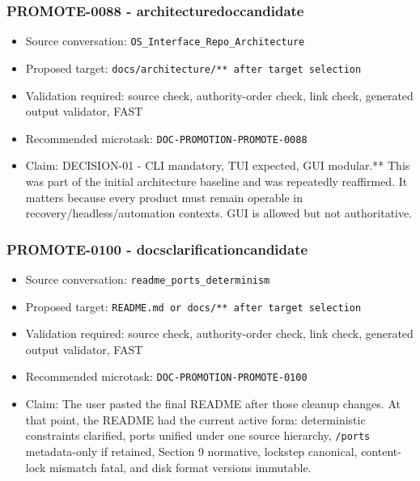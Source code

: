 \documentclass[9pt,a4paper,openany]{book}
\begin{document}
\subsubsection{PROMOTE-0088 - architecturedoccandidate}

\begin{itemize}
\item Source conversation: \texttt{OS\_\allowbreak{}Interface\_\allowbreak{}Repo\_\allowbreak{}Architecture}
\item Proposed target: \texttt{docs/\allowbreak{}architecture/\allowbreak{}** after target selection}
\item Validation required: source check, authority-\allowbreak{}order check, link check, generated output validator, FAST
\item Recommended microtask: \texttt{DOC-\allowbreak{}PROMOTION-\allowbreak{}PROMOTE-\allowbreak{}0088}
\item Claim: DECISION-\allowbreak{}01 -\allowbreak{} CLI mandatory, TUI expected, GUI modular.\allowbreak{}** This was part of the initial architecture baseline and was repeatedly reaffirmed.\allowbreak{} It matters because every product must remain operable in recovery/\allowbreak{}headless/\allowbreak{}automation contexts.\allowbreak{} GUI is allowed but not authoritative.\allowbreak{}
\end{itemize}

\subsubsection{PROMOTE-0100 - docsclarificationcandidate}

\begin{itemize}
\item Source conversation: \texttt{readme\_\allowbreak{}ports\_\allowbreak{}determinism}
\item Proposed target: \texttt{README.\allowbreak{}md or docs/\allowbreak{}** after target selection}
\item Validation required: source check, authority-\allowbreak{}order check, link check, generated output validator, FAST
\item Recommended microtask: \texttt{DOC-\allowbreak{}PROMOTION-\allowbreak{}PROMOTE-\allowbreak{}0100}
\item Claim: The user pasted the final README after those cleanup changes.\allowbreak{} At that point, the README had the current active form: deterministic constraints clarified, ports unified under one source hierarchy, \texttt{/\allowbreak{}ports} metadata-\allowbreak{}only if retained, Section 9 normative, lockstep canonical, content-\allowbreak{}lock mismatch fatal, and disk format versions immutable.\allowbreak{}
\end{itemize}
\end{document}
